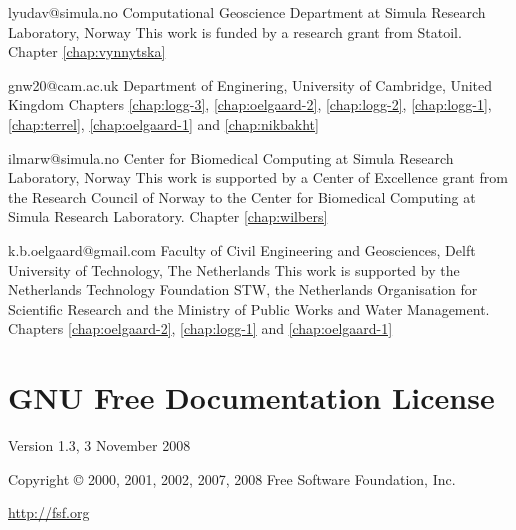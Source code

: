             {lyudav@simula.no}
             {Computational Geoscience Department at Simula Research Laboratory, Norway}
             {This work is funded by a research grant from Statoil.}
             {Chapter \ref{chap:vynnytska}}

             {gnw20@cam.ac.uk}
             {Department of Enginering, University of Cambridge, United Kingdom}
             {}
             {Chapters
              \ref{chap:logg-3},
              \ref{chap:oelgaard-2},
              \ref{chap:logg-2},
              \ref{chap:logg-1},
              \ref{chap:terrel},
              \ref{chap:oelgaard-1} and
              \ref{chap:nikbakht}}

             {ilmarw@simula.no}
             {Center for Biomedical Computing at Simula Research Laboratory, Norway}
             {This work is supported by a Center of Excellence grant
              from the Research Council of Norway to the Center for
              Biomedical Computing at Simula Research Laboratory.}
             {Chapter \ref{chap:wilbers}}

             {k.b.oelgaard@gmail.com}
             {Faculty of Civil Engineering and Geosciences,
              Delft University of Technology, The Netherlands}
             {This work is supported by the Netherlands Technology Foundation
              STW, the Netherlands Organisation for Scientific Research and the
              Ministry of Public Works and Water Management.}
             {Chapters
              \ref{chap:oelgaard-2},
              \ref{chap:logg-1} and
              \ref{chap:oelgaard-1}}

\chapter*{GNU Free Documentation License}
\addtocounter{chapter}{1}
\vspace{-1cm}

Version 1.3, 3 November 2008

Copyright \copyright{} 2000, 2001, 2002, 2007, 2008  Free Software Foundation, Inc.

\bigskip

\url{http://fsf.org}

\bigskip

